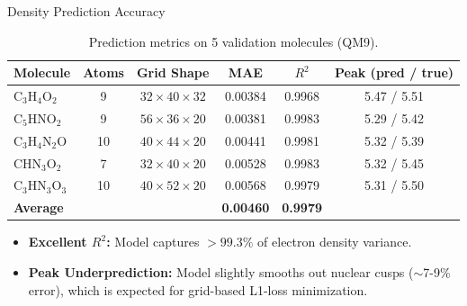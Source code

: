 \documentclass[aspectratio=169]{beamer}
\begin{document}
\begin{frame}{Density Prediction Accuracy}
  \begin{table}[h]
    \centering
    \tiny
    \caption{Prediction metrics on 5 validation molecules (QM9).}
    \begin{tabular*}{\textwidth}{@{\extracolsep{\fill}}lccccc}
    \toprule
    Molecule & Atoms & Grid Shape & MAE & $R^2$ & Peak (pred / true) \\
    \midrule
    C$_3$H$_4$O$_2$ & 9  & $32\times40\times32$ & 0.00384 & 0.9968 & 5.47 / 5.51 \\
    C$_5$HNO$_2$    & 9  & $56\times36\times20$ & 0.00381 & 0.9983 & 5.29 / 5.42 \\
    C$_3$H$_4$N$_2$O & 10 & $40\times44\times20$ & 0.00441 & 0.9981 & 5.32 / 5.39 \\
    CHN$_3$O$_2$    & 7  & $32\times40\times20$ & 0.00528 & 0.9983 & 5.32 / 5.45 \\
    C$_3$HN$_3$O$_3$ & 10 & $40\times52\times20$ & 0.00568 & 0.9979 & 5.31 / 5.50 \\
    \midrule
    \textbf{Average} & & & \textbf{0.00460} & \textbf{0.9979} & \\
    \bottomrule
    \end{tabular*}
  \end{table}
  
  \begin{itemize}
      \item \textbf{Excellent $R^2$:} Model captures $>99.3\%$ of electron density variance.
      \item \textbf{Peak Underprediction:} Model slightly smooths out nuclear cusps ($\sim$7-9\% error), which is expected for grid-based L1-loss minimization.
  \end{itemize}
\end{frame}
\end{document}
